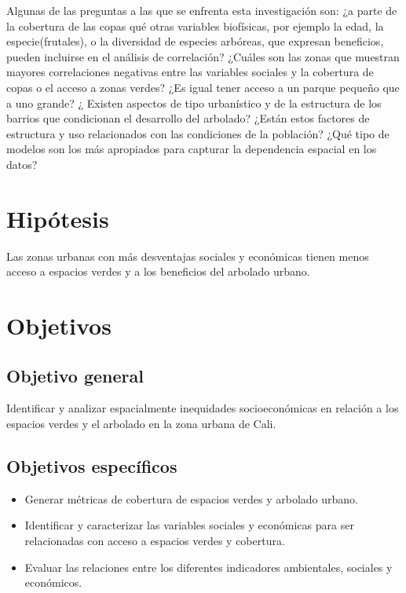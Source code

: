 \documentclass[12pt,]{book}
\providecommand{\tightlist}{%
  \setlength{\itemsep}{0pt}\setlength{\parskip}{0pt}}
\begin{document}
Algunas de las preguntas a las que se enfrenta esta investigación son:
¿a parte de la cobertura de las copas qué otras variables biofísicas,
por ejemplo la edad, la especie(frutales), o la diversidad de especies
arbóreas, que expresan beneficios, pueden incluirse en el análisis de
correlación? ¿Cuáles son las zonas que muestran mayores correlaciones
negativas entre las variables sociales y la cobertura de copas o el
acceso a zonas verdes? ¿Es igual tener acceso a un parque pequeño que a
uno grande? ¿ Existen aspectos de tipo urbanístico y de la estructura de
los barrios que condicionan el desarrollo del arbolado? ¿Están estos
factores de estructura y uso relacionados con las condiciones de la
población? ¿Qué tipo de modelos son los más apropiados para capturar la
dependencia espacial en los datos?

\section{Hipótesis}\label{hipotesis}

Las zonas urbanas con más desventajas sociales y económicas tienen menos
acceso a espacios verdes y a los beneficios del arbolado urbano.

\section{Objetivos}\label{objetivos}

\subsection{Objetivo general}\label{objetivo-general}

Identificar y analizar espacialmente inequidades socioeconómicas en
relación a los espacios verdes y el arbolado en la zona urbana de Cali.

\subsection{Objetivos específicos}\label{objetivos-especificos}

\begin{itemize}
\tightlist
\item
  Generar métricas de cobertura de espacios verdes y arbolado urbano.
\item
  Identificar y caracterizar las variables sociales y económicas para
  ser relacionadas con acceso a espacios verdes y cobertura.
\item
  Evaluar las relaciones entre los diferentes indicadores ambientales,
  sociales y económicos.
\end{itemize}
\end{document}
